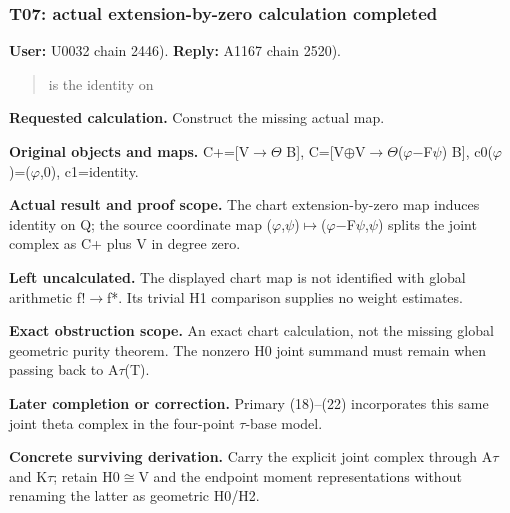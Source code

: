 \subsubsection{T07: actual extension-by-zero calculation
completed}\label{TranscriptLedgerStage:t07-actual-extension-by-zero-calculation-completed}

\textbf{User:} U0032
\protect{} chain 2446).
\textbf{Reply:} A1167
\protect{} chain 2520).

\begin{quote}
is the identity on
\end{quote}

\textbf{Requested calculation.} Construct the missing actual map.

\textbf{Original objects and maps.}
C+=[V\allowbreak{}\ensuremath{→}\allowbreak{}\allowbreak{}\ensuremath{Θ}\allowbreak{}
B{]},
C=[V\allowbreak{}\ensuremath{⊕}\allowbreak{}V\allowbreak{}\ensuremath{→}\allowbreak{}\allowbreak{}\ensuremath{Θ}\allowbreak{}(\allowbreak{}\ensuremath{φ}\allowbreak{}\allowbreak{}\ensuremath{−}\allowbreak{}F\allowbreak{}\ensuremath{ψ}\allowbreak{})
B{]},
c0(\allowbreak{}\ensuremath{φ}\allowbreak{})=(\allowbreak{}\ensuremath{φ}\allowbreak{},0),
c1=identity.

\textbf{Actual result and proof scope.} The chart extension-by-zero map
induces identity on Q; the source coordinate map
(\allowbreak{}\ensuremath{φ}\allowbreak{},\allowbreak{}\ensuremath{ψ}\allowbreak{})\allowbreak{}\ensuremath{↦}\allowbreak{}(\allowbreak{}\ensuremath{φ}\allowbreak{}\allowbreak{}\ensuremath{−}\allowbreak{}F\allowbreak{}\ensuremath{ψ}\allowbreak{},\allowbreak{}\ensuremath{ψ}\allowbreak{})
splits the joint complex as C+ plus V in degree zero.

\textbf{Left uncalculated.} The displayed chart map is not identified
with global arithmetic f!\allowbreak{}\ensuremath{→}\allowbreak{}f*. Its
trivial H1 comparison supplies no weight estimates.

\textbf{Exact obstruction scope.} An exact chart calculation, not the
missing global geometric purity theorem. The nonzero H0 joint summand
must remain when passing back to
A\allowbreak{}\ensuremath{τ}\allowbreak{}(T).

\textbf{Later completion or correction.} Primary (18)--(22) incorporates
this same joint theta complex in the four-point
\allowbreak{}\ensuremath{τ}\allowbreak{}-base model.

\textbf{Concrete surviving derivation.} Carry the explicit joint complex
through A\allowbreak{}\ensuremath{τ}\allowbreak{} and
K\allowbreak{}\ensuremath{τ}\allowbreak{}; retain
H0\allowbreak{}\ensuremath{≅}\allowbreak{}V and the endpoint moment
representations without renaming the latter as geometric H0/H2.

